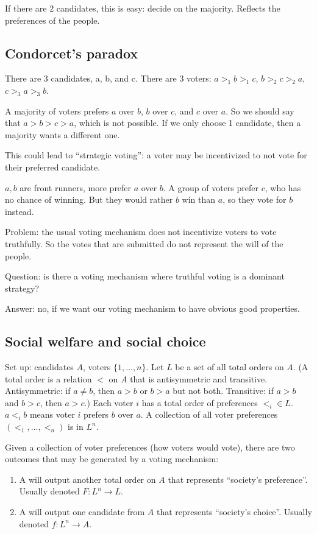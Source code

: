 \documentclass[12pt,letterpaper]{report}
\begin{document}
If there are 2 candidates, this is easy: decide on the majority.
Reflects the preferences of the people.

\subsection{Condorcet's paradox}

There are 3 candidates, a, b, and c.
There are 3 voters: $a >_1 b >_1 c$, $b >_2 c >_2 a$, $c >_3 a >_3 b$.

A majority of voters prefers $a$ over $b$, $b$ over $c$, and $c$ over $a$.
So we should say that $a > b > c > a$, which is not possible.
If we only choose 1 candidate, then a majority wants a different one.

This could lead to ``strategic voting'': a voter may be incentivized to not vote for their
preferred candidate.

\begin{ex}
  $a, b$ are front runners, more prefer $a$ over $b$.
  A group of voters prefer $c$, who has no chance of winning.
  But they would rather $b$ win than $a$, so they vote for $b$ instead.
\end{ex}

Problem: the usual voting mechanism does not incentivize voters to vote truthfully.
So the votes that are submitted do not represent the will of the people.

Question: is there a voting mechanism where truthful voting is a dominant strategy?

Answer: no, if we want our voting mechanism to have obvious good properties.

\subsection{Social welfare and social choice}

Set up: candidates $A$, voters $\{1, \ldots, n\}$.
Let $L$ be a set of all total orders on $A$.
(A total order is a relation $<$ on $A$ that is antisymmetric and transitive.
Antisymmetric: if $a \neq b$, then $a > b$ or $b > a$ but not both.
Transitive: if $a > b$ and $b > c$, then $a > c$.)
Each voter $i$ has a total order of preferences $<_i \in L$.
$a <_i b$ means voter $i$ prefers $b$ over $a$.
A collection of all voter preferences $(<_1, \ldots, <_n)$ is in $L^n$.

Given a collection of voter preferences (how voters would vote), there are two outcomes that may be
generated by a voting mechanism:
\begin{enumerate}
  \item
  A  will output another total order on $A$ that represents
  ``society's preference''.
  Usually denoted $F \colon L^n \to L$.
  \item
  A  will output one candidate from $A$ that represents ``society's
  choice''.
  Usually denoted $f \colon L^n \to A$.
\end{enumerate}
\end{document}
